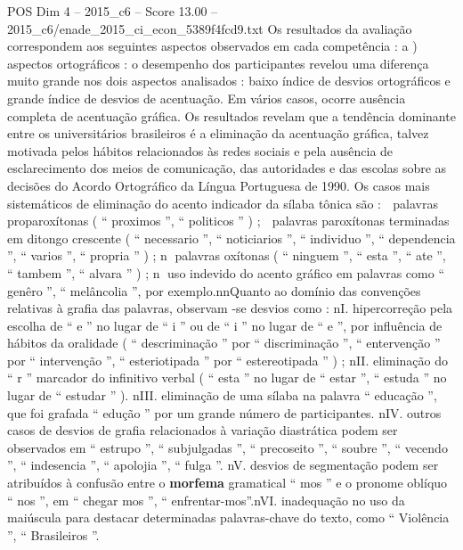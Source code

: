\begin{textsample}{POS Dim 4 – 2015\_c6 – Score 13.00 – 2015\_c6/enade\_2015\_ci\_econ\_5389f4fcd9.txt}
Os resultados da avaliação correspondem aos seguintes aspectos observados em cada competência : a ) aspectos ortográficos : o desempenho dos participantes revelou uma diferença muito grande nos dois aspectos analisados : baixo índice de desvios ortográficos e grande índice de desvios de acentuação.
Em vários casos, ocorre ausência completa de acentuação gráfica.
Os resultados revelam que a tendência dominante entre os universitários brasileiros é a eliminação da acentuação gráfica, talvez motivada pelos hábitos relacionados às redes sociais e pela ausência de esclarecimento dos meios de comunicação, das autoridades e das escolas sobre as decisões do Acordo Ortográfico da Língua Portuguesa de 1990.
Os casos mais sistemáticos de eliminação do acento indicador da sílaba tônica são :  palavras proparoxítonas ( “ proximos ”, “ politicos ” ) ;  palavras paroxítonas terminadas em ditongo crescente ( “ necessario ”, “ noticiarios ”, “ individuo ”, “ dependencia ”, “ varios ”, “ propria ” ) ; n palavras oxítonas ( “ ninguem ”, “ esta ”, “ ate ”, “ tambem ”, “ alvara ” ) ; n uso indevido do acento gráfico em palavras como “ genêro ”, “ melâncolia ”, por exemplo.nnQuanto ao domínio das convenções relativas à grafia das palavras, observam -se desvios como : nI. hipercorreção pela escolha de “ e ” no lugar de “ i ” ou de “ i ” no lugar de “ e ”, por influência de hábitos da oralidade ( “ descriminação ” por “ discriminação ”, “ entervenção ” por “ intervenção ”, “ esteriotipada ” por “ estereotipada ” ) ; nII. eliminação do “ r ” marcador do infinitivo verbal ( “ esta ” no lugar de “ estar ”, “ estuda ” no lugar de “ estudar ” ). nIII. eliminação de uma sílaba na palavra “ educação ”, que foi grafada “ edução ” por um grande número de participantes. nIV. outros casos de desvios de grafia relacionados à variação diastrática podem ser observados em “ estrupo ”, “ subjulgadas ”, “ precoseito ”, “ soubre ”, “ vecendo ”, “ indesencia ”, “ apolojia ”, “ fulga ”. nV. desvios de segmentação podem ser atribuídos à confusão entre o \textbf{morfema} gramatical “ mos ” e o pronome oblíquo “ nos ”, em “ chegar mos ”, “ enfrentar-mos”.nVI. inadequação no uso da maiúscula para destacar determinadas palavras-chave do texto, como “ Violência ”, “ Brasileiros ”.

\end{textsample}
